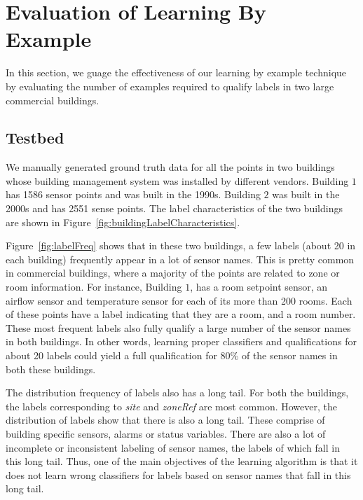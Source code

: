 \section{Evaluation of Learning By Example}
\label{sec:eval}

In this section, we guage the effectiveness of our learning by example technique by evaluating the number of examples required to qualify labels in two large commercial buildings. 

\subsection{Testbed}

We manually generated ground truth data for all the points in two buildings whose building management system was installed by different vendors. Building $1$ has 1586 sensor points and was built in the 1990s. Building $2$ was built in the 2000s and has 2551 sense points. The label characteristics of the two buildings are shown in Figure~\ref{fig:buildingLabelCharacteristics}. 

Figure~\ref{fig:labelFreq} shows that in  these two buildings, a few labels (about 20 in each building) frequently appear in a lot of sensor names. This is pretty common in commercial buildings, where a majority of the points are related to zone or room information. For instance, Building $1$, has a room setpoint sensor, an airflow sensor and temperature sensor for each of its more than 200 rooms. Each of these points have a label indicating that they are a room, and a room number. These most frequent labels also fully qualify a large number of the sensor names in both buildings. In other words, learning proper classifiers and qualifications for about 20 labels could yield a full qualification for 80\% of the sensor names in both these buildings.

The distribution frequency of labels also has a long tail. For both the buildings, the labels corresponding to {\it site} and {\it zoneRef} are most common. However, the distribution of labels show that there is also a long tail. These comprise of building specific sensors, alarms or status variables. There are also a lot of incomplete or inconsistent labeling of sensor names, the labels of which fall in this long tail. Thus, one of the main objectives of the learning algorithm is that it does not learn wrong classifiers for labels based on sensor names that fall in this long tail.

